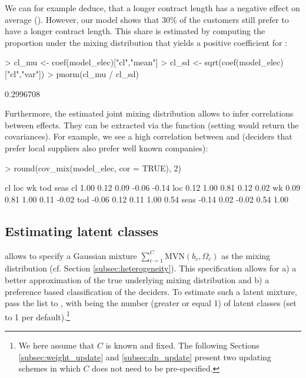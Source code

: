 \documentclass[article]{jss}
\newcommand{\fct}[1]{\code{#1()}}
\begin{document}
We can for example deduce, that a longer contract length has a negative effect on average (). However, our model shows that 30\% of the customers still prefer to have a longer contract length. This share is estimated by computing the proportion under the mixing distribution that yields a positive coefficient for :

\begin{Schunk}
\begin{Sinput}
> cl_mu <- coef(model_elec)["cl","mean"]
> cl_sd <- sqrt(coef(model_elec)["cl","var"])
> pnorm(cl_mu / cl_sd)
\end{Sinput}
\begin{Soutput}
[1] 0.2996708
\end{Soutput}
\end{Schunk}

Furthermore, the estimated joint mixing distribution allows to infer correlations between effects. They can be extracted via the \fct{cov\_mix} function (setting  would return the covariances). For example, we see a high correlation between  and  (deciders that prefer local suppliers also prefer well known companies):

\begin{Schunk}
\begin{Sinput}
> round(cov_mix(model_elec, cor = TRUE), 2)
\end{Sinput}
\begin{Soutput}
        cl  loc    wk   tod  seas
cl    1.00 0.12  0.09 -0.06 -0.14
loc   0.12 1.00  0.81  0.12  0.02
wk    0.09 0.81  1.00  0.11 -0.02
tod  -0.06 0.12  0.11  1.00  0.54
seas -0.14 0.02 -0.02  0.54  1.00
\end{Soutput}
\end{Schunk}

\subsection{Estimating latent classes} \label{subsec:latent_classes}

 allows to specify a Gaussian mixture $\sum_{c=1}^C \text{MVN} (b_c,\Omega_c)$ as the mixing distribution (cf. Section \ref{subsec:heterogeneity}). This specification allows for a) a better approximation of the true underlying mixing distribution and b) a preference based classification of the deciders. To estimate such a latent mixture, pass the list  to \fct{fit\_model}, with  being the number (greater or equal 1) of latent classes (set to 1 per default).\footnote{We here assume that $C$ is known and fixed. The following Sections \ref{subsec:weight_update} and \ref{subsec:dp_update} present two updating schemes in which $C$ does not need to be pre-specified.}
\end{document}
